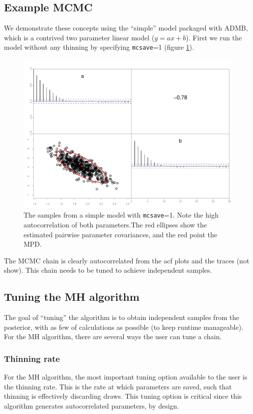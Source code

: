 \documentclass{article}\usepackage[]{graphicx}\usepackage[]{color}
\begin{document}
\subsection{Example MCMC}
We demonstrate these concepts using the ``simple'' model
packaged with ADMB, which is a contrived two parameter
linear model ($y=ax+b$). First we run the model without any
thinning by specifying \texttt{mcsave}=1 (figure
\ref{fig:simple1}).
\begin{figure}[h]
  \centering
  \includegraphics[width=5in]{../plots/simple1.pdf}
  \caption{The samples from a simple model with
    \texttt{mcsave}=1. Note the high autocorrelation of both
    parameters.The red ellipses show the estimated pairwise
    parameter covariances, and the red point the MPD.}
  \label{fig:simple1}
\end{figure}
The MCMC chain is clearly autocorrelated from the acf plots
and the traces (not show). This chain needs to be tuned to
achieve independent samples.
\subsection{Tuning the MH algorithm}
The goal of ``tuning'' the algorithm is to obtain
independent samples from the posterior, with as few of
calculations as possible (to keep runtime manageable). For
the MH algorithm, there are several ways the user can tune a chain.

\subsubsection{Thinning rate}
For the MH algorithm, the most important tuning option
available to the user is the thinning rate. This is the rate
at which parameters are saved, such that thinning is
effectively discarding draws. This tuning option is critical
since this algorithm generates autocorrelated parameters, by
design.
\end{document}
